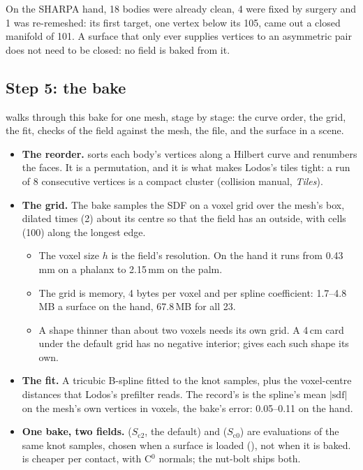 On the SHARPA hand, 18 bodies were already clean, 4 were fixed by surgery and 1 was re-remeshed: its first target, one vertex below its 105, came out a closed manifold of 101. A surface that only ever supplies vertices to an asymmetric pair does not need to be closed: no field is baked from it.

\subsection{Step 5: the bake}\label{sec:step5}

 walks through this bake for one mesh, stage by stage: the curve order, the grid, the fit, checks of the field against the mesh, the file, and the surface in a scene.

\begin{itemize}
\item \textbf{The reorder.}  sorts each body's vertices along a Hilbert curve and renumbers the faces. It is a permutation, and it is what makes Lodos's tiles tight: a run of 8 consecutive vertices is a compact cluster (collision manual, \emph{Tiles}).
\item \textbf{The grid.} The bake samples the SDF on a voxel grid over the mesh's box, dilated  times (2) about its centre so that the field has an outside, with  cells (100) along the longest edge.
  \begin{itemize}
  \item The voxel size $h$ is the field's resolution. On the hand it runs from 0.43\,mm on a phalanx to 2.15\,mm on the palm.
  \item The grid is memory, 4 bytes per voxel and per spline coefficient: 1.7--4.8\,MB a surface on the hand, 67.8\,MB for all 23.
  \item A shape thinner than about two voxels needs its own grid. A 4\,cm card under the default grid has no negative interior;  gives each such shape its own.
  \end{itemize}
\item \textbf{The fit.} A tricubic B-spline fitted to the knot samples, plus the voxel-centre distances that Lodos's prefilter reads. The record's  is the spline's mean $\lvert\mathrm{sdf}\rvert$ on the mesh's own vertices in voxels, the bake's error: 0.05--0.11 on the hand.
\item \textbf{One bake, two fields.}  ($S_{\mathrm{c2}}$, the default) and  ($S_{\mathrm{c0}}$) are evaluations of the same knot samples, chosen when a surface is loaded (), not when it is baked.  is cheaper per contact, with C$^0$ normals; the nut-bolt ships both.
\end{itemize}

